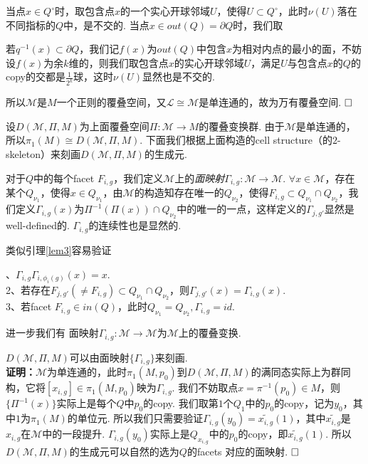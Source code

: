 \documentclass{article}
\theoremstyle{plain}%
\theoremstyle{definition}
\theoremstyle{remark}
\begin{document}
当点$x\in Q^\circ$时，取包含点$x$的一个实心开球邻域$U$，使得$U\subset Q^\circ$，此时$\nu(U)$落在不同指标的$Q$中，是不交的.
当点$x\in out(Q)=\partial Q$时，我们取

若$q^{-1}(x)\subset \partial Q$，我们记$f(x)$为$out(Q)$中包含$x$为相对内点的最小的面，不妨设$f(x)$为余$k$维的，则我们取包含点$x$的实心开球邻域$U$，满足$U$与包含点$x$的$Q$的copy的交都是$\frac{1}{2^k}$球，这时$\nu(U)$显然也是不交的.

所以$\mathcal{M}$是$M$一个正则的覆叠空间，又$\mathcal{L}\cong \mathcal{M}$是单连通的，故为万有覆叠空间.
$\hfill{} \Box$


设$D(\mathcal{M},\Pi,M)$为上面覆叠空间$\Pi: \mathcal{M}\longrightarrow M$的覆叠变换群. 由于$\mathcal{M}$是单连通的，所以$\pi_1(M)\cong D(\mathcal{M},\Pi,M)$. 
下面我们根据上面构造的cell structure（的$2$-skeleton）来刻画$D(\mathcal{M},\Pi,M)$的生成元. 

对于$Q$中的每个facet $F_{i,g}$，我们定义$\mathcal{M}$上的{\em 面映射}$\Gamma_{i,g}:\mathcal{M}\longrightarrow \mathcal{M}$. $\forall x\in \mathcal{M}$，存在某个$Q_{\nu_1}$，使得$x\in Q_{\nu_1}$，由$\mathcal{M}$的构造知存在唯一的$Q_{\nu_2}$，使得$F_{i,g}\subset Q_{\nu_1}\cap Q_{\nu_2}$，我们定义$\Gamma_{i,g}(x)$为$\Pi^{-1}(\Pi(x))\cap Q_{\nu_2}$中的唯一的一点，这样定义的$\Gamma_{j,g'}$显然是well-defined的. $\Gamma_{i,g}$的连续性也是显然的.

类似引理\ref{lem3}容易验证

{、$\Gamma_{i,g}\Gamma_{i,\phi_i(g)}(x)=x$. \\
2、若存在$F_{j,g'}(\neq F_{i,g})\subset Q_{\nu_1}\cap Q_{\nu_2}$，则$\Gamma_{j,g'}(x)=\Gamma_{i,g}(x)$. \\
3、若facet $F_{i,g}\in in(Q)$，此时$Q_{\nu_1}=Q_{\nu_2},\Gamma_{i,g}=id.$}

进一步我们有
{\lem 面映射$\Gamma_{i,g}:\mathcal{M}\longrightarrow \mathcal{M}$为$\mathcal{M}$上的覆叠变换.
}



{\prop $D(\mathcal{M},\Pi,M)$可以由面映射$\{\Gamma_{i,g}\}$来刻画.}\\
{\bf 证明：}$\mathcal{M}$为单连通的，此时$\pi_1(M,p_0)$到$D(\mathcal{M},\Pi,M)$的满同态实际上为群同构，它将$[x_{i,g}]\in \pi_1(M,p_0)$映为$\Gamma_{i,g}$. 
我们不妨取点$x=\pi^{-1}(p_0)\in M$，则$\{\Pi^{-1}(x)\}$实际上是每个$Q$中$p_0$的copy. 我们取第$1$个$Q_1$中的$p_0$的copy，记为$y_0$，其中$1$为$\pi_1(M)$的单位元. 所以我们只需要验证$\Gamma_{i,g}(y_0)=\widetilde{x_{i,g}}(1)$，其中$\widetilde{x_{i,g}}$是$x_{i,g}$在$\mathcal{M}$中的一段提升.
$\Gamma_{i,g}(y_0)$实际上是$Q_{x_{i,g}}$中的$p_0$的copy，即$\widetilde{x_{i,g}}(1)$. 所以$D(\mathcal{M},\Pi,M)$的生成元可以自然的选为$Q$的facets 对应的面映射.  $\hfill{} \Box$
\end{document}

